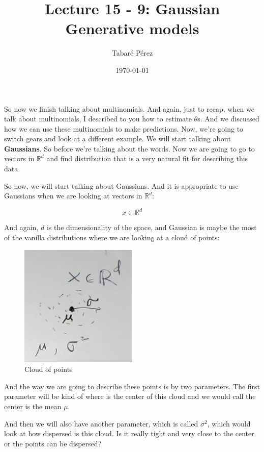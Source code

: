 \documentclass[a4paper, 12pt]{article}
\author{Tabaré Pérez}
\date{\today}
\title{Lecture 15 - 9: Gaussian Generative models}
\begin{document}
\maketitle
So now we finish talking about multinomials. And again, just to recap, when we
talk about multinomials, I described to you how to estimate \(\theta\)s. And we
discussed how we can use these multinomials to make predictions. Now, we're
going to switch gears and look at a different example. We will start talking
about \textbf{Gaussians}. So before we're talking about the words. Now we are going to
go to vectors in \(\mathbb{R}^d\) and find distribution that is a very natural
fit for describing this data.

So now, we will start talking about Gaussians. And it is appropriate to use
Gaussians when we are looking at vectors in \(\mathbb{R}^d\):

\begin{equation}
x \in \mathbb{R}^d
\end{equation}

And again, \(d\) is the dimensionality of the space, and Gaussian is maybe the
most of the vanilla distributions where we are looking at a cloud of points:

\begin{figure}[H]
\centering
\includegraphics[width=0.5\textwidth]{./pic/u04-08-fig-01.png}
\caption{\label{fig:org5045666}Cloud of points}
\end{figure}

And the way we are going to describe these points is by two parameters. The
first parameter will be kind of where is the center of this cloud and we would
call the center is the mean \(\mu\).

And then we will also have another parameter, which is called \(\sigma^2\),
which would look at how dispersed is this cloud. Is it really tight and very
close to the center or the points can be dispersed?
\end{document}
